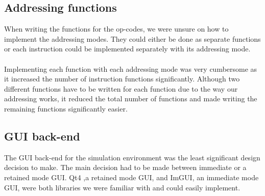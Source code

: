 \documentclass[conference]{IEEEtran}
\begin{document}
\subsection{Addressing functions}

When writing the functions for the op-codes, we were unsure on how to implement the addressing modes. They could either be done as separate functions or each instruction could be implemented separately with its addressing mode.\\

\\

Implementing each function with each addressing mode was very cumbersome as it increased the number of instruction functions significantly. Although two different functions have to be written for each function due to the way our addressing works, it reduced the total number of functions and made writing the remaining functions significantly easier. 

\subsection{GUI back-end}

The GUI back-end for the simulation environment was the least significant design decision to make. The main decision had to be made between immediate or a retained mode GUI. Qt4 ,a retained mode GUI, and ImGUI, an immediate mode GUI, were both libraries we were familiar with and could easily implement. \\

\\
\end{document}
